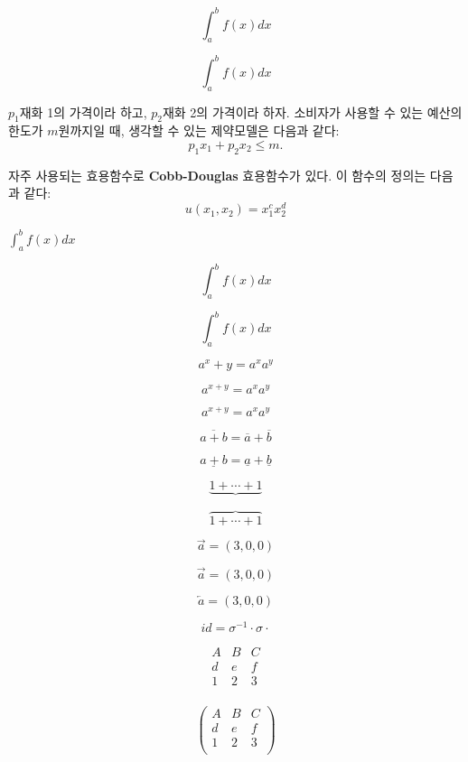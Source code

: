 \documentclass{oblivoir}
\begin{document}
\[ \int_{a}^b f(x)dx \]

\begin{equation}
\int_{a}^b f(x) dx
\end{equation}

$p_1$\을 재화 1의 가격이라 하고, $p_2$\을 재화 2의 가격이라 하자. 소비자가 사용할 수 있는 예산의 한도가 $m$원까지일 때, 생각할 수 있는 제약모델은 다음과 같다:
\begin{equation}
p_1 x_1 + p_2 x_2 
\leq m.
\end{equation}

자주 사용되는 효용함수로 \textbf{Cobb-Douglas} 효용함수가 있다. 이 함수의 정의는 다음과 같다:
\[ u(x_1, x_2) = x_1^c x_2^d \]

$\int_a^b f(x)dx$

\[ \int_{a}^b f(x)dx \]

\begin{equation}
\int_{a}^b f(x) dx
\end{equation}

\begin{equation}
a^x+y = a^x a^y
\end{equation}

\begin{equation*}
a^{x+y} = a^x a^y
\end{equation*}

\[ a^{x+y} = a^x a^y \]

\[ \overline{a+b} = \overline{a} + \overline{b} \]

\[ \underline{a+b} = \underline{a} + \underline{b} \]

\[ \underbrace{1+ \cdots + 1}\]

\[ \overbrace{1+ \cdots +1} \]

\[ \vec{a}=\left(3,0,0\right) \]

\[ \overrightarrow{a}=\left(3,0,0\right) \]

\[ \overleftarrow{a}=\left(3,0,0\right) \]

\[ id = \sigma^{-1} \cdot \sigma \cdot \]

\[\begin{matrix}
A & B & C \\
d & e & f \\
1 & 2 & 3 \\
\end{matrix}
\]

\[\begin{pmatrix}
A & B & C \\
d & e & f \\
1 & 2 & 3 \\
\end{pmatrix}
\]
\end{document}
